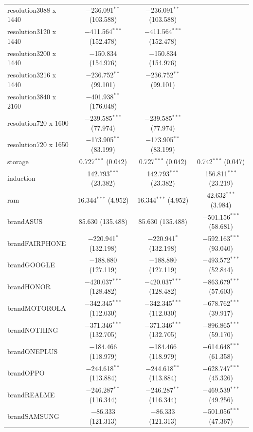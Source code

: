 \documentclass[
  12pt,
]{report}
\begin{document}
\begin{table}[!htbp]
\begin{tabular}{@{\extracolsep{5pt}}lccc}
  resolution3088 x 1440 & $-$236.091$^{**}$ (103.588) & $-$236.091$^{**}$ (103.588) &  \\ 
  resolution3120 x 1440 & $-$411.564$^{***}$ (152.478) & $-$411.564$^{***}$ (152.478) &  \\ 
  resolution3200 x 1440 & $-$150.834 (154.976) & $-$150.834 (154.976) &  \\ 
  resolution3216 x 1440 & $-$236.752$^{**}$ (99.101) & $-$236.752$^{**}$ (99.101) &  \\ 
  resolution3840 x 2160 & $-$401.938$^{**}$ (176.048) &  &  \\ 
  resolution720 x 1600 & $-$239.585$^{***}$ (77.974) & $-$239.585$^{***}$ (77.974) &  \\ 
  resolution720 x 1650 & $-$173.905$^{**}$ (83.199) & $-$173.905$^{**}$ (83.199) &  \\ 
  storage & 0.727$^{***}$ (0.042) & 0.727$^{***}$ (0.042) & 0.742$^{***}$ (0.047) \\ 
  induction & 142.793$^{***}$ (23.382) & 142.793$^{***}$ (23.382) & 156.811$^{***}$ (23.219) \\ 
  ram & 16.344$^{***}$ (4.952) & 16.344$^{***}$ (4.952) & 42.632$^{***}$ (3.984) \\ 
  brandASUS & 85.630 (135.488) & 85.630 (135.488) & $-$501.156$^{***}$ (58.681) \\ 
  brandFAIRPHONE & $-$220.941$^{*}$ (132.198) & $-$220.941$^{*}$ (132.198) & $-$592.163$^{***}$ (93.040) \\ 
  brandGOOGLE & $-$188.880 (127.119) & $-$188.880 (127.119) & $-$493.572$^{***}$ (52.844) \\ 
  brandHONOR & $-$420.037$^{***}$ (128.482) & $-$420.037$^{***}$ (128.482) & $-$863.679$^{***}$ (57.603) \\ 
  brandMOTOROLA & $-$342.345$^{***}$ (112.030) & $-$342.345$^{***}$ (112.030) & $-$678.762$^{***}$ (39.917) \\ 
  brandNOTHING & $-$371.346$^{***}$ (132.705) & $-$371.346$^{***}$ (132.705) & $-$896.865$^{***}$ (59.170) \\ 
  brandONEPLUS & $-$184.466 (118.979) & $-$184.466 (118.979) & $-$614.648$^{***}$ (61.358) \\ 
  brandOPPO & $-$244.618$^{**}$ (113.884) & $-$244.618$^{**}$ (113.884) & $-$628.747$^{***}$ (45.326) \\ 
  brandREALME & $-$246.287$^{**}$ (116.344) & $-$246.287$^{**}$ (116.344) & $-$469.539$^{***}$ (49.256) \\ 
  brandSAMSUNG & $-$86.333 (121.313) & $-$86.333 (121.313) & $-$501.056$^{***}$ (47.367) \\ 

\end{tabular}
\end{table}
\end{document}
